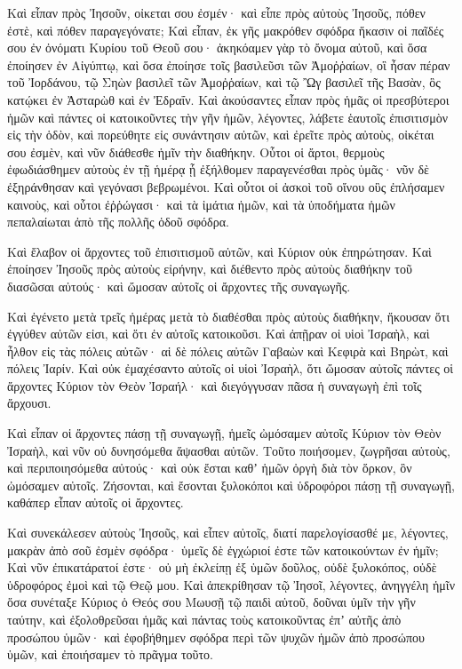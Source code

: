 {Καὶ εἶπαν πρὸς Ἰησοῦν, οἰκεται σου ἐσμέν· καὶ εἶπε πρὸς αὐτοὺς Ἰησοῦς, πόθεν ἐστὲ, καὶ πόθεν παραγεγόνατε;
Καὶ εἶπαν, ἐκ γῆς μακρόθεν σφόδρα ἥκασιν οἱ παῖδές σου ἐν ὀνόματι Κυρίου τοῦ Θεοῦ σου· ἀκηκόαμεν γὰρ τὸ ὄνομα αὐτοῦ, καὶ ὅσα ἐποίησεν ἐν Αἰγύπτῳ,
καὶ ὅσα ἐποίησε τοῖς βασιλεῦσι τῶν Ἀμοῤῥαίων, οἳ ἦσαν πέραν τοῦ Ἰορδάνου, τῷ Σηὼν βασιλεῖ τῶν Ἀμοῤῥαίων, καὶ τῷ Ὢγ βασιλεῖ τῆς Βασὰν, ὃς κατῴκει ἐν Ἀσταρὼθ καὶ ἐν Ἐδραΐν.
Καὶ ἀκούσαντες εἶπαν πρὸς ἡμᾶς οἱ πρεσβύτεροι ἡμῶν καὶ πάντες οἱ κατοικοῦντες τὴν γῆν ἡμῶν, λέγοντες, λάβετε ἑαυτοῖς ἐπισιτισμὸν εἰς τὴν ὁδὸν, καὶ πορεύθητε εἰς συνάντησιν αὐτῶν, καὶ ἐρεῖτε πρὸς αὐτοὺς, οἰκέται σου ἐσμὲν, καὶ νῦν διάθεσθε ἡμῖν τὴν διαθήκην.
Οὗτοι οἱ ἄρτοι, θερμοὺς ἐφωδιάσθημεν αὐτοὺς ἐν τῇ ἡμέρᾳ ᾗ ἐξήλθομεν παραγενέσθαι πρὸς ὑμᾶς· νῦν δὲ ἐξηράνθησαν καὶ γεγόνασι βεβρωμένοι.
Καὶ οὗτοι οἱ ἀσκοὶ τοῦ οἴνου οὓς ἐπλήσαμεν καινοὺς, καὶ οὗτοι ἐῤῥώγασι· καὶ τὰ ἱμάτια ἡμῶν, καὶ τὰ ὑποδήματα ἡμῶν πεπαλαίωται ἀπὸ τῆς πολλῆς ὁδοῦ σφόδρα.
\par }{\PP {}Καὶ ἔλαβον οἱ ἄρχοντες τοῦ ἐπισιτισμοῦ αὐτῶν, καὶ Κύριον οὐκ ἐπηρώτησαν.
Καὶ ἐποίησεν Ἰησοῦς πρὸς αὐτοὺς εἰρήνην, καὶ διέθεντο πρὸς αὐτοὺς διαθήκην τοῦ διασῶσαι αὐτούς· καὶ ὤμοσαν αὐτοῖς οἱ ἄρχοντες τῆς συναγωγῆς.
\par }{\PP {}Καὶ ἐγένετο μετὰ τρεῖς ἡμέρας μετὰ τὸ διαθέσθαι πρὸς αὐτοὺς διαθήκην, ἤκουσαν ὅτι ἐγγύθεν αὐτῶν εἰσι, καὶ ὅτι ἐν αὐτοῖς κατοικοῦσι.
Καὶ ἀπῇραν οἱ υἱοὶ Ἰσραὴλ, καὶ ἦλθον εἰς τὰς πόλεις αὐτῶν· αἱ δὲ πόλεις αὐτῶν Γαβαὼν καὶ Κεφιρὰ καὶ Βηρὼτ, καὶ πόλεις Ἰαρίν.
Καὶ οὐκ ἐμαχέσαντο αὐτοῖς οἱ υἱοὶ Ἰσραὴλ, ὅτι ὤμοσαν αὐτοῖς πάντες οἱ ἄρχοντες Κύριον τὸν Θεὸν Ἰσραήλ· καὶ διεγόγγυσαν πᾶσα ἡ συναγωγὴ ἐπὶ τοῖς ἄρχουσι.
\par }{\PP {}Καὶ εἶπαν οἱ ἄρχοντες πάσῃ τῇ συναγωγῇ, ἡμεῖς ὠμόσαμεν αὐτοῖς Κύριον τὸν Θεὸν Ἰσραὴλ, καὶ νῦν οὐ δυνησόμεθα ἅψασθαι αὐτῶν.
Τοῦτο ποιήσομεν, ζωγρῆσαι αὐτοὺς, καὶ περιποιησόμεθα αὐτούς· καὶ οὐκ ἔσται καθʼ ἡμῶν ὀργὴ διὰ τὸν ὅρκον, ὃν ὠμόσαμεν αὐτοῖς.
Ζήσονται, καὶ ἔσονται ξυλοκόποι καὶ ὑδροφόροι πάσῃ τῇ συναγωγῇ, καθάπερ εἶπαν αὐτοῖς οἱ ἄρχοντες.
\par }{\PP {}Καὶ συνεκάλεσεν αὐτοὺς Ἰησοῦς, καὶ εἶπεν αὐτοῖς, διατί παρελογίσασθέ με, λέγοντες, μακρὰν ἀπὸ σοῦ ἐσμὲν σφόδρα· ὑμεῖς δὲ ἐγχώριοί ἐστε τῶν κατοικούντων ἐν ἡμῖν;
Καὶ νῦν ἐπικατάρατοί ἐστε· οὐ μὴ ἐκλείπῃ ἐξ ὑμῶν δοῦλος, οὐδὲ ξυλοκόπος, οὐδὲ ὑδροφόρος ἐμοὶ καὶ τῷ Θεῷ μου.
Καὶ ἀπεκρίθησαν τῷ Ἰησοῖ, λέγοντες, ἀνηγγέλη ἡμῖν ὅσα συνέταξε Κύριος ὁ Θεός σου Μωυσῇ τῷ παιδὶ αὐτοῦ, δοῦναι ὑμῖν τὴν γῆν ταύτην, καὶ ἐξολοθρεῦσαι ἡμᾶς καὶ πάντας τοὺς κατοικοῦντας ἐπʼ αὐτῆς ἀπὸ προσώπου ὑμῶν· καὶ ἐφοβήθημεν σφόδρα περὶ τῶν ψυχῶν ἡμῶν ἀπὸ προσώπου ὑμῶν, καὶ ἐποιήσαμεν τὸ πρᾶγμα τοῦτο.
}
